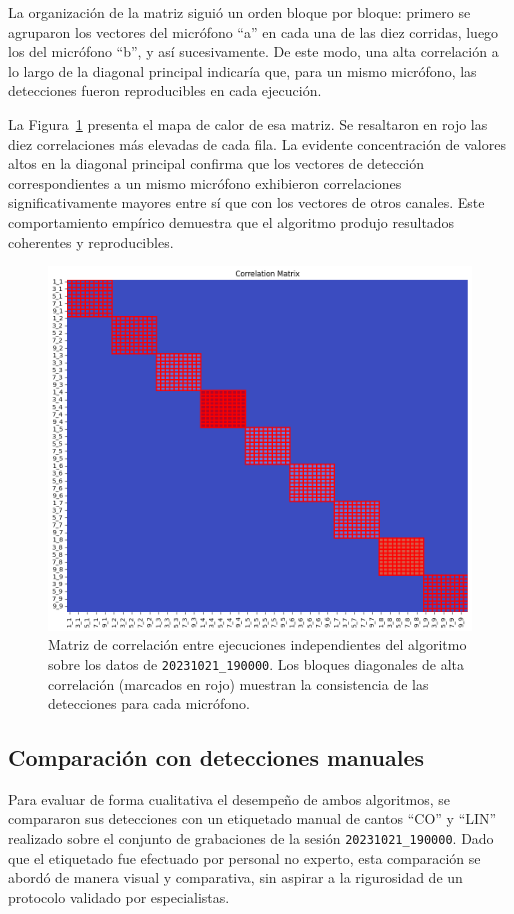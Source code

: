 La organización de la matriz siguió un orden bloque por bloque: 
primero se agruparon los vectores del micrófono “a” en cada una 
de las diez corridas, luego los del micrófono “b”, y así 
sucesivamente. De este modo, una alta correlación a lo largo de 
la diagonal principal indicaría que, para un mismo micrófono, 
las detecciones fueron reproducibles en cada ejecución.

La Figura~\ref{fig:correlation} presenta el mapa de calor de esa 
matriz. Se resaltaron en rojo las diez correlaciones más 
elevadas de cada fila. La evidente concentración de valores 
altos en la diagonal principal confirma que los vectores de 
detección correspondientes a un mismo micrófono exhibieron 
correlaciones significativamente mayores entre sí que con los 
vectores de otros canales. Este comportamiento empírico 
demuestra que el algoritmo produjo resultados coherentes y 
reproducibles.

\begin{figure}[ht]
    \centering
    \includegraphics[width=0.7\linewidth]{Graphics/correlation_matrix.png}
    \caption{Matriz de correlación entre ejecuciones independientes del algoritmo sobre los datos de \texttt{20231021\_190000}. Los bloques diagonales de alta correlación (marcados en rojo) muestran la consistencia de las detecciones para cada micrófono.}
    \label{fig:correlation}
\end{figure}


\subsection{Comparación con detecciones manuales}

Para evaluar de forma cualitativa el desempeño de ambos 
algoritmos, se compararon sus detecciones con un etiquetado 
manual de cantos “CO” y “LIN” realizado sobre el conjunto de 
grabaciones de la sesión \texttt{20231021\_190000}. Dado que el 
etiquetado fue efectuado por personal no experto, esta comparación 
se abordó de manera visual y comparativa, sin aspirar a la 
rigurosidad de un protocolo validado por especialistas.  

